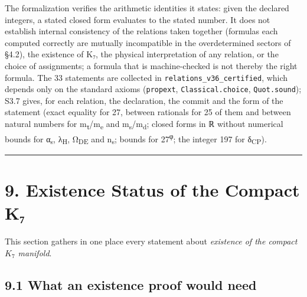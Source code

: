\documentclass[11pt,a4paper]{article}
\begin{document}
The formalization verifies the arithmetic identities it states: given the declared integers, a stated closed form evaluates to the stated number. It does not establish internal consistency of the relations taken together (formulas each computed correctly are mutually incompatible in the overdetermined sectors of §4.2), the existence of K₇, the physical interpretation of any relation, or the choice of assignments; a formula that is machine-checked is not thereby the right formula. The 33 statements are collected in \texttt{relations\_\allowbreak{}v36\_\allowbreak{}certified}, which depends only on the standard axioms (\texttt{propext}, \texttt{Classical.\allowbreak{}choice}, \texttt{Quot.\allowbreak{}sound}); S3.7 gives, for each relation, the declaration, the commit and the form of the statement (exact equality for 27, between rationals for 25 of them and between natural numbers for m\textsubscript{τ}/m\textsubscript{e} and m\textsubscript{s}/m\textsubscript{d}; closed forms in ℝ without numerical bounds for α\textsubscript{s}, λ\textsubscript{H}, Ω\textsubscript{DE} and n\textsubscript{s}; bounds for 27\textsuperscript{φ}; the integer 197 for δ\textsubscript{CP}).

\begin{center}\rule{\linewidth}{0.5pt}\end{center}

\section{9. Existence Status of the Compact K₇}\label{existence-status-of-the-compact-kux2087}

This section gathers in one place every statement about \emph{existence of the compact \(K_7\) manifold}.

\subsection{9.1 What an existence proof would need}\label{what-an-existence-proof-would-need}
\end{document}
